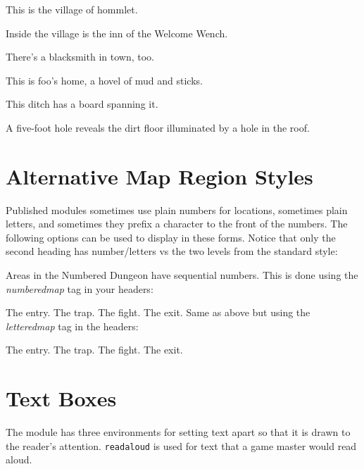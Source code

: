 \documentclass[10pt,twoside,twocolumn,openany,bg=full,notitlepage,nodeprecatedcode]{dndarticle}
\begin{document}
\label{sec:org7ce7e2e}

This is the village of hommlet.

\label{sec:org2ab8933}

Inside the village is the inn of the Welcome Wench.

\label{sec:orge4f5be6}

There's a blacksmith in town, too.

\label{sec:orgcfe469c}

This is foo's home, a hovel of mud and sticks.

\label{sec:org7078b10}

This ditch has a board spanning it.

\label{sec:orgb5669ca}

A five-foot hole reveals the dirt floor illuminated by a hole in the roof.

\section{Alternative Map Region Styles}
\label{sec:orgce3e3a9}
    Published modules sometimes use plain numbers for locations, sometimes plain letters, and sometimes they prefix a
character to the front of the numbers. The following options can be used to display in these forms. Notice that only the
second heading has number/letters vs the two levels from the standard style:

\label{sec:orgde35e6f}
Areas in the Numbered Dungeon have sequential numbers. This is done using
the \emph{numberedmap} tag in your headers:

\label{sec:orga9eb5c9}
The entry.
\label{sec:org50d62cc}
The trap.
\label{sec:org290e62f}
The fight.
\label{sec:org6d2d823}
The exit.
\label{sec:org6d13f02}
Same as above but using the \emph{letteredmap} tag in the headers:

\label{sec:orga96d721}
The entry.
\label{sec:org1087e10}
The trap.
\label{sec:org04f8d81}
The fight.
\label{sec:org6299321}
The exit.
\section{Text Boxes}
\label{sec:org9956a76}
The module has three environments for setting text apart so that it is drawn to the reader's attention. \texttt{readaloud} is used for text that a game master would read aloud.
\end{document}
